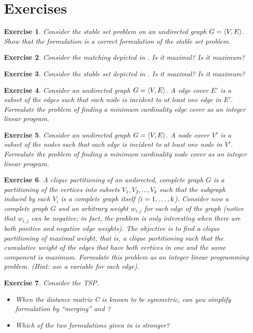 \documentclass[titlepage]{book}
\newtheorem{exercise}{Exercise}
\begin{document}
\section*{Exercises}
\begin{exercise}
Consider the stable set problem on an undirected graph $G=\tupl{V,E}$. Show that the formulation  is a correct formulation of the stable set problem.
\end{exercise}
\begin{exercise}
Consider the matching depicted in . Is it maximal? Is it maximum?
\end{exercise}
\begin{exercise}
Consider the stable set depicted in . Is it maximal? Is it maximum?
\end{exercise}
\begin{exercise}
Consider an undirected graph $G=\tupl{V,E}$. A edge cover $E'$ is a subset of the edges such that each node is incident to at least one edge in $E'$. Formulate the problem of finding a minimum cardinality edge cover as an integer linear program.
\end{exercise}
\begin{exercise}
Consider an undirected graph $G=\tupl{V,E}$. A node cover $V'$ is a subset of the nodes such that each edge is incident to at least one node in $V'$. Formulate the problem of finding a minimum cardinality node cover as an integer linear program.
\end{exercise}
\begin{exercise}
A clique partitioning of an undirected, complete graph $G$ is a partitioning of the vertices into subsets $V_1,V_2,\ldots,V_k$ such that the subgraph induced by each $V_i$ is a complete graph itself ($\rangei[i]{1}{k}$). Consider now a complete graph $G$ and an arbitrary weight $w_{i,j}$ for each edge of the graph (notice that $w_{i,j}$ can be negative; in fact, the problem is only interesting when there are both positive and negative edge weights). The objective is to find a clique partitioning of maximal weight, that is, a clique partitioning such that the cumulative weight of the edges that have both vertices in one and the same component is maximum. Formulate this problem as an integer linear programming problem. (Hint: use a variable for each edge).
\end{exercise}
\begin{exercise}
Consider the TSP.
\begin{itemize}
 \item When the distance matrix C is known to be symmetric, can you simplify formulation  by ``merging''  and ?
 \item Which of the two formulations given in  is stronger?
\end{itemize}
\end{exercise}
\end{document}
